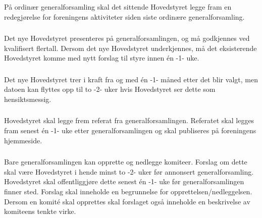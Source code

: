 \subsubsection{}
På ordinær generalforsamling skal det sittende Hovedstyret legge fram en
redegjørelse for foreningens aktiviteter siden siste ordinære
generalforsamling.

\subsubsection{}
Det nye Hovedstyret presenteres på generalforsamlingen, og må godkjennes ved
kvalifisert flertall. Dersom det nye Hovedstyret underkjennes, må det eksisterende
Hovedstyret komme med nytt forslag til styre innen én -1- uke.

\subsubsection{}
Det nye Hovedstyret trer i kraft fra og med én -1- måned etter det blir valgt,
men datoen kan flyttes opp til to -2- uker hvis Hovedstyret ser dette som hensiktsmessig.

\subsubsection{}
Hovedstyret skal legge frem referat fra generalforsamlingen. Referatet skal
legges fram senest én -1- uke etter generalforsamlingen og skal publiseres på
foreningens hjemmeside.

\subsubsection{}
Bare generalforsamlingen kan opprette og nedlegge komiteer. Forslag om dette
skal være Hovedstyret i hende minst to -2- uker før annonsert
generalforsamling. Hovedstyret skal offentliggjøre dette senest én -1- uke før
generalforsamlingen finner sted. Forslag skal inneholde en begrunnelse for
opprettelsen/nedleggelsen. Dersom en komité skal opprettes skal forslaget også
inneholde en beskrivelse av komiteens tenkte virke.
